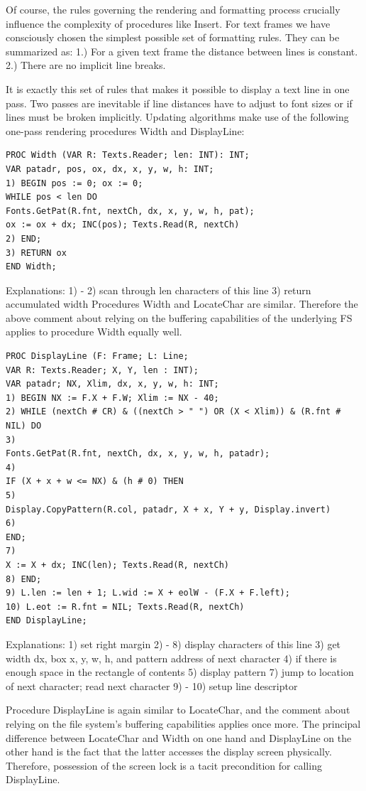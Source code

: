 Of course, the rules governing the rendering and formatting process crucially influence the
complexity of procedures like Insert. For text frames we have consciously chosen the simplest
possible set of formatting rules. They can be summarized as:
1.) For a given text frame the distance between lines is constant.
2.) There are no implicit line breaks.

It is exactly this set of rules that makes it possible to display a text line in one pass. Two passes are
inevitable if line distances have to adjust to font sizes or if lines must be broken implicitly.
Updating algorithms make use of the following one-pass rendering procedures Width and
DisplayLine:
\begin{verbatim}
PROC Width (VAR R: Texts.Reader; len: INT): INT;
VAR patadr, pos, ox, dx, x, y, w, h: INT;
1) BEGIN pos := 0; ox := 0;
WHILE pos < len DO
Fonts.GetPat(R.fnt, nextCh, dx, x, y, w, h, pat);
ox := ox + dx; INC(pos); Texts.Read(R, nextCh)
2) END;
3) RETURN ox
END Width;
\end{verbatim}

Explanations:
1) - 2) scan through len characters of this line
3) return accumulated width
Procedures Width and LocateChar are similar. Therefore the above comment about relying on the
buffering capabilities of the underlying FS applies to procedure Width equally well.
\begin{verbatim}
PROC DisplayLine (F: Frame; L: Line;
VAR R: Texts.Reader; X, Y, len : INT);
VAR patadr; NX, Xlim, dx, x, y, w, h: INT;
1) BEGIN NX := F.X + F.W; Xlim := NX - 40;
2) WHILE (nextCh # CR) & ((nextCh > " ") OR (X < Xlim)) & (R.fnt # NIL) DO
3)
Fonts.GetPat(R.fnt, nextCh, dx, x, y, w, h, patadr);
4)
IF (X + x + w <= NX) & (h # 0) THEN
5)
Display.CopyPattern(R.col, patadr, X + x, Y + y, Display.invert)
6)
END;
7)
X := X + dx; INC(len); Texts.Read(R, nextCh)
8) END;
9) L.len := len + 1; L.wid := X + eolW - (F.X + F.left);
10) L.eot := R.fnt = NIL; Texts.Read(R, nextCh)
END DisplayLine;
\end{verbatim}

Explanations:
1) set right margin
2) - 8) display characters of this line
3) get width dx, box x, y, w, h, and pattern address of next character
4) if there is enough space in the rectangle of contents
5) display pattern
7) jump to location of next character; read next character
9) - 10) setup line descriptor

Procedure DisplayLine is again similar to LocateChar, and the comment about relying on the file
system’s buffering capabilities applies once more. The principal difference between LocateChar
and Width on one hand and DisplayLine on the other hand is the fact that the latter accesses the
display screen physically. Therefore, possession of the screen lock is a tacit precondition for calling
DisplayLine.

